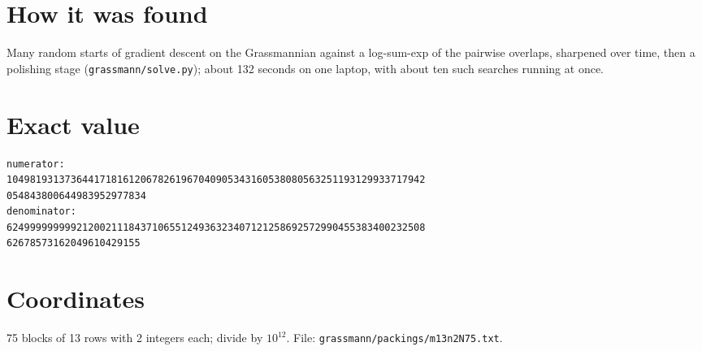 \documentclass[11pt,a4paper]{article}
\begin{document}
\section{How it was found}
Many random starts of gradient descent on the Grassmannian against a log-sum-exp of the pairwise overlaps, sharpened over time, then a polishing stage (\texttt{grassmann/solve.py}); about 132 seconds on one laptop, with about ten such searches running at once.


\appendix
\section{Exact value}
{\small
\begin{verbatim}
numerator:
104981931373644171816120678261967040905343160538080563251193129933717942
054843800644983952977834
denominator:
624999999999212002111843710655124936323407121258692572990455383400232508
62678573162049610429155
\end{verbatim}}

\section{Coordinates}
75 blocks of 13 rows with 2 integers each; divide by $10^{12}$. File: \texttt{grassmann/packings/m13n2N75.txt}.
{\tiny
\begin{multicols}{4}
\end{multicols}}
\end{document}
